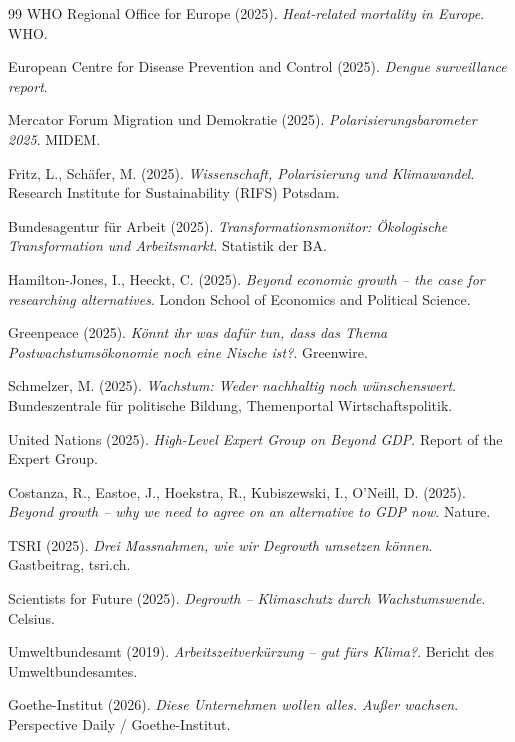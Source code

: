 \documentclass[12pt, a4paper]{article}
\begin{document}
\begin{thebibliography}{99}
		WHO Regional Office for Europe (2025). \textit{Heat-related mortality in Europe}. WHO.
		
		European Centre for Disease Prevention and Control (2025). \textit{Dengue surveillance report}.
		
		Mercator Forum Migration und Demokratie (2025). \textit{Polarisierungsbarometer 2025}. MIDEM.
		
		Fritz, L., Schäfer, M. (2025). \textit{Wissenschaft, Polarisierung und Klimawandel}. Research Institute for Sustainability (RIFS) Potsdam.
		
		Bundesagentur für Arbeit (2025). \textit{Transformationsmonitor: Ökologische Transformation und Arbeitsmarkt}. Statistik der BA.
		
		Hamilton-Jones, I., Heeckt, C. (2025). \textit{Beyond economic growth – the case for researching alternatives}. London School of Economics and Political Science.
		
		Greenpeace (2025). \textit{Könnt ihr was dafür tun, dass das Thema Postwachstumsökonomie noch eine Nische ist?}. Greenwire.
		
		Schmelzer, M. (2025). \textit{Wachstum: Weder nachhaltig noch wünschenswert}. Bundeszentrale für politische Bildung, Themenportal Wirtschaftspolitik.
		
		United Nations (2025). \textit{High-Level Expert Group on Beyond GDP}. Report of the Expert Group.
		
		Costanza, R., Eastoe, J., Hoekstra, R., Kubiszewski, I., O'Neill, D. (2025). \textit{Beyond growth – why we need to agree on an alternative to GDP now}. Nature.
		
		TSRI (2025). \textit{Drei Massnahmen, wie wir Degrowth umsetzen können}. Gastbeitrag, tsri.ch.
		
		Scientists for Future (2025). \textit{Degrowth – Klimaschutz durch Wachstumswende}. Celsius.
		
		Umweltbundesamt (2019). \textit{Arbeitszeitverkürzung – gut fürs Klima?}. Bericht des Umweltbundesamtes.
		
		Goethe-Institut (2026). \textit{Diese Unternehmen wollen alles. Außer wachsen}. Perspective Daily / Goethe-Institut.
		

\end{thebibliography}
\end{document}
